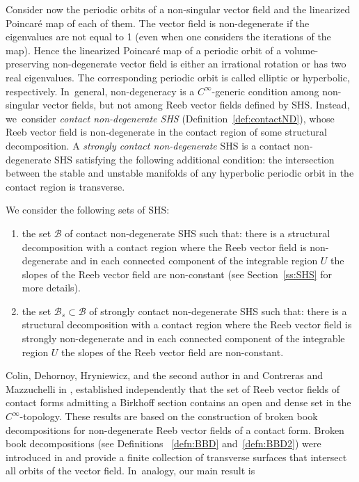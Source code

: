 \documentclass[JEP,XML,SOM,Unicode,NoEqCountersInSection,NoFloatCountersInSection,published]{cedram}
\theoremstyle{definition}
\begin{document}
Consider now the periodic orbits of a non-singular vector field and the linearized Poincaré map of each of them.
The vector field is non-degenerate if the eigenvalues are not equal to 1 (even when one considers the iterations of the map). Hence the linearized Poincaré map of a periodic orbit of a volume-preserving non-degenerate vector field is either an irrational rotation or has two real eigenvalues. The corresponding periodic orbit is called elliptic or hyperbolic, respectively. In~general, non-degeneracy is a $C^\infty$\nobreakdash-generic condition among non-singular vector fields, but not among Reeb vector fields defined by SHS. Instead, we~consider \emph{contact non-degenerate SHS} (Definition~\ref{def:contactND}), whose Reeb vector field is non-degenerate in the contact region of some structural decomposition. A \emph{strongly contact non-degenerate} SHS is a contact non-degenerate SHS satisfying the following additional condition: the intersection between the stable and unstable manifolds of any hyperbolic periodic orbit in the contact region is transverse.

We consider the following sets of SHS:
\begin{enumerate}
\item the set $\mathcal{B}$ of contact non-degenerate SHS such that: there is a structural decomposition with a contact region where the Reeb vector field is non-degenerate and in each connected component of the integrable region $U$ the slopes of the Reeb vector field are non-constant (see Section~\ref{ss:SHS} for more details).
\item the set $\mathcal{B}_s\subset \mathcal{B}$ of strongly contact non-degenerate SHS such that: there is a structural decomposition with a contact region where the Reeb vector field is strongly non-degenerate and in each connected component of the integrable region $U$ the slopes of the Reeb vector field are non-constant.
\end{enumerate}

Colin, Dehornoy, Hryniewicz, and the second author in \cite{CDHR} and Contreras and Mazzuchelli in \cite{CM}, established independently that the set
of Reeb vector fields of contact forms admitting a Birkhoff section contains an open and dense set in the $C^\infty$\nobreakdash-topology. These results are based on the construction of broken book decompositions for non-degenerate Reeb vector fields of a contact form. Broken book decompositions (see Definitions ~\ref{defn:BBD} and~\ref{defn:BBD2}) were introduced in \cite{CDR} and provide a finite collection of transverse surfaces that intersect all orbits of the vector field. In~analogy, our main result is
\end{document}
